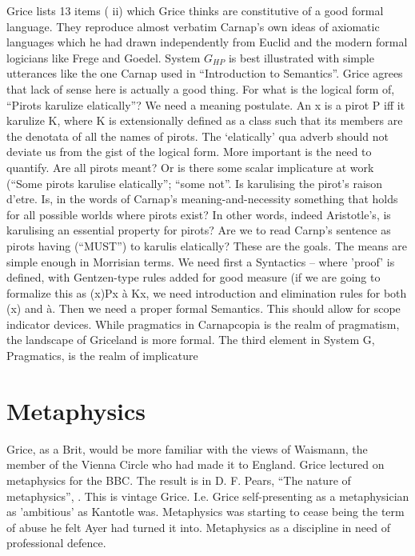 \documentclass[10pt,titlepage]{book}
\begin{document}
Grice lists 13 items (\cite{grice89} ii) which Grice thinks are constitutive of a good formal language.
They reproduce almost verbatim Carnap’s own ideas of axiomatic languages which he had drawn independently from Euclid and the modern formal logicians like Frege and Goedel.
System $G_{HP}$ is best illustrated with simple utterances like the one Carnap used in ``Introduction to Semantics''.
Grice agrees that lack of sense here is actually a good thing.
For what is the logical  form of, ``Pirots karulize elatically''?
We need a meaning postulate.
An x is a pirot P iff it karulize K, where K is extensionally defined as a class such that its members are the denotata of all 
the names of pirots.
The ‘elatically’ qua adverb should not deviate us from the gist of the logical form.
More important is the need to quantify.
Are all pirots meant?
Or is there some scalar implicature at work (``Some pirots karulise elatically''; ``some not''.
Is karulising the pirot’s  raison d’etre.
Is, in the words of Carnap’s meaning-and-necessity something that holds for all possible worlds where pirots exist?
In other words, indeed Aristotle’s, is karulising an essential property for pirots?
Are we to read Carnp's sentence as pirots having (``MUST'') to karulis elatically?
These are the  goals.
The means are simple enough in Morrisian terms.
We need first a Syntactics  – where 'proof' is defined, with Gentzen-type rules added for good measure (if we are going to formalize this as (x)Px à Kx, we need introduction and elimination rules for both (x) and à.
Then we need a proper formal Semantics.
This should allow for scope indicator devices.
While pragmatics in Carnapcopia is the realm of pragmatism, the landscape of Griceland is more formal.
The third element in System G, Pragmatics, is the realm of implicature 

\section{Metaphysics}

Grice, as a Brit, would be more familiar with the views of Waismann, the member of the Vienna Circle who had made it to  England.
Grice lectured on metaphysics for the BBC.
The result is in D. F. Pears, ``The nature of metaphysics'', \cite{grice57}.
This is vintage Grice.
I.e. Grice self-presenting as a metaphysician as 'ambitious' as Kantotle was.
Metaphysics was starting to cease being the term of abuse he felt Ayer had turned it into. 
Metaphysics as a discipline in need of professional defence.
\end{document}
